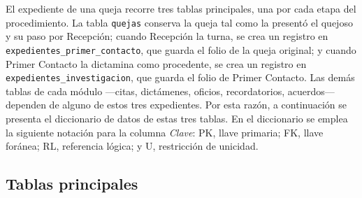 El expediente de una queja recorre tres tablas principales, una por cada etapa del procedimiento. La tabla \texttt{quejas} conserva la queja tal como la presentó el quejoso y su paso por Recepción; cuando Recepción la turna, se crea un registro en \texttt{expedientes\_primer\_contacto}, que guarda el folio de la queja original; y cuando Primer Contacto la dictamina como procedente, se crea un registro en \texttt{expedientes\_investigacion}, que guarda el folio de Primer Contacto. Las demás tablas de cada módulo ---citas, dictámenes, oficios, recordatorios, acuerdos--- dependen de alguno de estos tres expedientes. Por esta razón, a continuación se presenta el diccionario de datos de estas tres tablas. En el diccionario se emplea la siguiente notación para la columna \emph{Clave}: PK, llave primaria; FK, llave foránea; RL, referencia lógica; y U, restricción de unicidad.

\subsection{Tablas principales}

